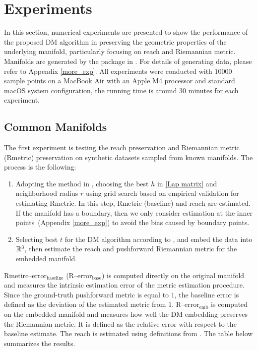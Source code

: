\section{Experiments}
\label{sec:experiments}

In this section, numerical experiments are presented to show the performance of the proposed DM algorithm in preserving the geometric properties of the underlying manifold, particularly focusing on reach and Riemannian metric. Manifolds are generated by the package in \cite{JMLR:v23:19-644}. For details of generating data, please refer to Appendix \ref{more_exp}. All experiments were conducted with $10000$ sample points on a MacBook Air with an Apple M4 processor and standard macOS system configuration, the running time is around $30$ minutes for each experiment. 

\subsection{Common Manifolds}

The first experiment is testing the reach preservation and Riemannian metric (Rmetric) preservation on synthetic datasets sampled from known manifolds. 
The process is the following: 
\begin{enumerate}
    \item Adopting the method in \cite{rmetric,joncas2017improved}, choosing the best $h$ in \cref{Lap matrix} and neighborhood radius $r$ using grid search based on empirical validation for estimating Rmetric. In this step, Rmetric (baseline) and reach are estimated. If the manifold has a boundary, then we only consider estimation at the inner points~(Appendix \ref{more_exp}) to avoid the bias caused by boundary points.
    \item Selecting best $t$ for the DM algorithm according to \cite{rmetric,joncas2017improved}, and embed the data into $\mathbb{R}^3$, then estimate the reach and pushforward Riemannian metric for the embedded manifold.
\end{enumerate}

$\text{Rmetirc--error}_{\text{baseline}}$ ($\text{R--error}_{\text{base}}$) is computed directly on the original manifold and measures the intrinsic estimation error of the metric estimation procedure. Since the ground-truth pushforward metric is equal to $1$, the baseline error is defined as the deviation of the estimated metric from $1$.
$\text{R--error}_{\text{emb}}$ is computed on the embedded manifold and measures how well the DM embedding preserves the Riemannian metric. It is defined as the relative error with respect to the baseline estimate.
The reach is estimated using definitions from \cite{aamari2019estimating}. The table below summarizes the results.



